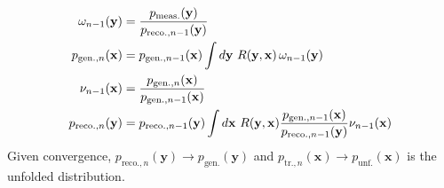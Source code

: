\begin{align}
	\label{eq:generalUnfolding}
	\omega_{n-1}(\mathbf{y}) &= \frac{p_\mathrm{meas.}(\mathbf{y})}{p_{\mathrm{reco.}, n-1}(\mathbf{y})} \notag\\
	p_{\mathrm{gen.}, n}(\mathbf{x}) &= p_{\mathrm{gen.}, n-1}(\mathbf{x})\int d\mathbf{y}~R(\mathbf{y}, \mathbf{x})\,\omega_{n-1}(\mathbf{y})\notag\\
	\nu_{n-1}(\mathbf{x}) &= \frac{p_{\mathrm{gen.}, n}(\mathbf{x})}{p_{\mathrm{gen.}, n-1}(\mathbf{x})} \notag\\
	p_{\mathrm{reco.}, n}(\mathbf{y}) &= p_{\mathrm{reco.}, n-1}(\mathbf{y}) \int d\mathbf{x}~R(\mathbf{y}, \mathbf{x})\frac{p_{\mathrm{gen.}, n-1}(\mathbf{x})}{p_{\mathrm{reco.}, n-1}(\mathbf{y})}\nu_{n-1}(\mathbf{x}) 
\end{align}
%
Given convergence, \(p_{\mathrm{reco.}, n}(\mathbf{y}) \to p_\mathrm{gen.}(\mathbf{y})\) and \(p_{\mathrm{tr.}, n}(\mathbf{x}) \to p_{\mathrm{unf.}}(\mathbf{x})\) is the unfolded distribution. 



